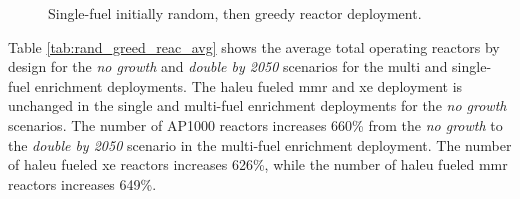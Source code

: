 \begin{figure}[H]
    \hfill
    \caption{Single-fuel initially random, then greedy reactor deployment.}
    \label{fig:rand_greed_of_reactors}
\end{figure}

Table \ref{tab:rand_greed_reac_avg} shows the average total operating reactors by design for the \textit{no growth} and \textit{double by 2050} scenarios for the multi and single-fuel enrichment deployments. The \gls{haleu} fueled \gls{mmr} and \gls{xe} deployment is unchanged in the single and multi-fuel enrichment deployments for the \textit{no growth} scenarios. The number of AP1000 reactors increases 660\% from the \textit{no growth} to the \textit{double by 2050} scenario in the multi-fuel enrichment deployment. The number of \gls{haleu} fueled \gls{xe} reactors increases 626\%, while the number of \gls{haleu} fueled \gls{mmr} reactors increases 649\%.

